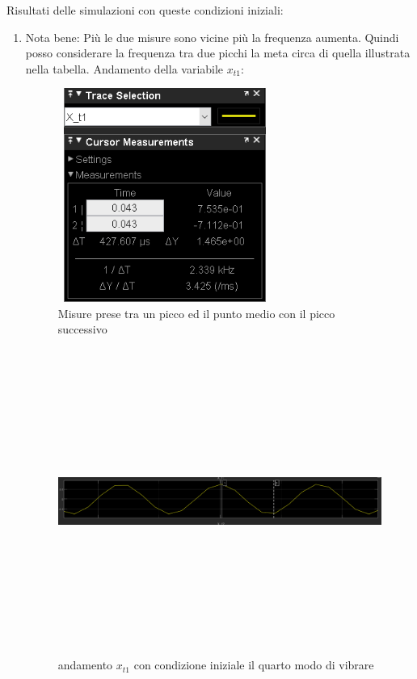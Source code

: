 \documentclass{article}
\begin{document}
    
Risultati delle simulazioni con queste condizioni iniziali: 
\begin{enumerate}

    \item 
        Nota bene: Più le due misure sono vicine più la frequenza aumenta. Quindi posso considerare la frequenza tra due picchi la meta circa di quella illustrata nella tabella. Andamento della variabile $x_{t1}$:
        \begin{figure}[H]
        \centering
        \includegraphics[width=7cm,height=7cm,keepaspectratio]{./simulink/assex/modo4_t1tab.png}
        \caption{Misure prese tra un picco ed il punto medio con il picco successivo}
        \end{figure}
        
        \begin{figure}[H]
        \centering
        \includegraphics[width=12cm,height=10cm,keepaspectratio]{./simulink/assex/modo4_t1.png}
        \caption{andamento $x_{t1}$ con condizione iniziale il quarto modo di vibrare}
        \end{figure}


\end{enumerate}
\end{document}
